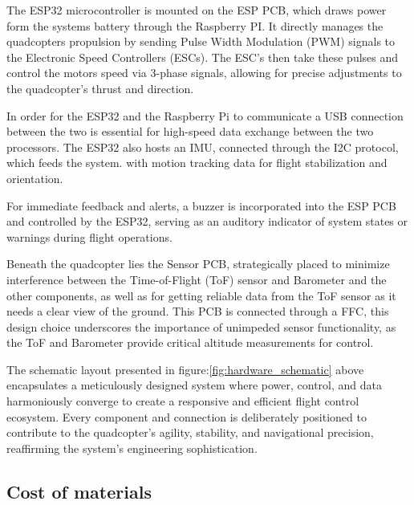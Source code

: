 \documentclass{article}
\begin{document}
The ESP32 microcontroller is mounted on the ESP PCB, which draws power form the
systems battery through the Raspberry PI. It directly manages the quadcopters
propulsion by sending Pulse Width Modulation (PWM) signals to the Electronic
Speed Controllers (ESCs). The ESC’s then take these pulses and control the
motors speed via 3-phase signals, allowing for precise adjustments to the
quadcopter's thrust and direction.

In order for the ESP32 and the Raspberry Pi to communicate a USB connection
between the two is essential for high-speed data exchange between the two
processors. The ESP32 also hosts an IMU, connected through the I2C protocol,
which feeds the system. with motion tracking data for flight stabilization and
orientation.

For immediate feedback and alerts, a buzzer is incorporated into the ESP PCB and
controlled by the ESP32, serving as an auditory indicator of system states or
warnings during flight operations.

Beneath the quadcopter lies the Sensor PCB, strategically placed to minimize
interference between the Time-of-Flight (ToF) sensor and Barometer and the other
components, as well as for getting reliable data from the ToF sensor as it needs
a clear view of the ground. This PCB is connected through a FFC, this design
choice underscores the importance of unimpeded sensor functionality, as the ToF
and Barometer provide critical altitude measurements for control.

The schematic layout presented in figure:\ref{fig:hardware_schematic}  above
encapsulates a meticulously designed system where power, control, and data
harmoniously converge to create a responsive and efficient flight control
ecosystem. Every component and connection is deliberately positioned to
contribute to the quadcopter’s agility, stability, and navigational precision,
reaffirming the system’s engineering sophistication.

\subsection{Cost of materials}
\end{document}
